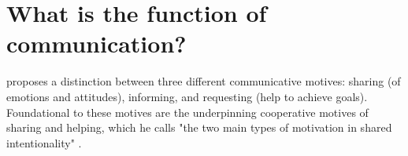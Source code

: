 \section{What is the function of communication?}
\label{sec:comm:function}

\citet{Tomasello08-origins} proposes a distinction between three different communicative motives: sharing (of emotions and attitudes), informing, and requesting (help to achieve goals). Foundational to these motives are the underpinning cooperative motives of sharing and helping, which he calls "the two main types of motivation in shared intentionality" \citep[p.~123]{Tomasello08-origins}.
